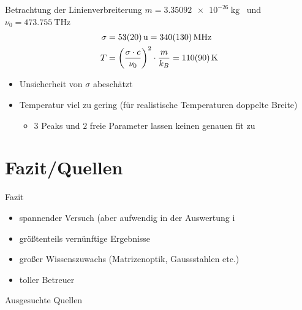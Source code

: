 \documentclass[10pt, aspectratio=169]{beamer}
\begin{document}
\begin{frame}{Betrachtung der Linienverbreiterung}
  \(m=\SI{3.35092e-26}{\kg}\)~\cite{IUPAC2013} und
  \(\nu_0=\SI{473.755}{\tera\hertz}\) ~\cite[226]{Sigrist2018}
  \begin{align}
    \sigma & = \SI{53\pm 20}{u} = \SI{340\pm 130}{\mega\hertz} \\
    T & = \qty(\frac{\sigma\cdot c}{\nu_0})^2\cdot \frac{m}{k_B}=\SI{110\pm 90}{\kelvin}
  \end{align}
  \begin{itemize}
  \item<1-> Unsicherheit von \(\sigma\) abesch\"atzt
  \item<2-> Temperatur viel zu gering (f\"ur realistische Temperaturen
    doppelte Breite)
    \begin{itemize}
    \item \(3\) Peaks und \(2\) freie Parameter lassen keinen genauen
      fit zu
    \end{itemize}
  \end{itemize}
   
\end{frame}




\section{Fazit/Quellen}

\begin{frame}{Fazit}
  \begin{itemize}
  \item<1-> spannender Versuch (aber aufwendig in der Auswertung ^^)
  \item<2-> gr\"o\ss{}tenteils vern\"unftige Ergebnisse
  \item<3-> gro\ss{}er Wissenszuwachs (Matrizenoptik, Gaussstahlen
    etc.)
  \item<4-> toller Betreuer
  \end{itemize}
\end{frame}
\begin{frame}[allowframebreaks]{Ausgesuchte Quellen}
  \printbibliography
\end{frame}
\end{document}
